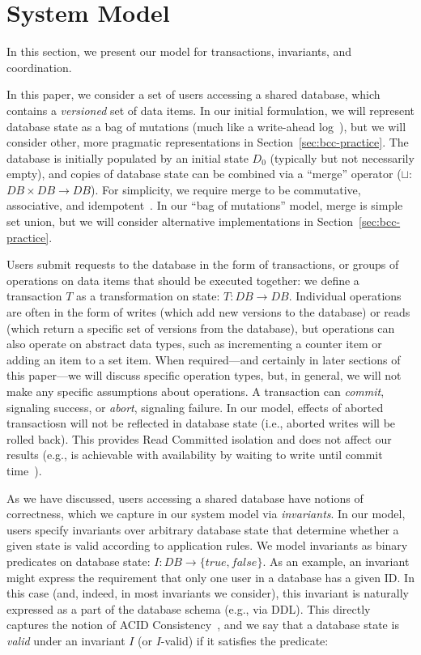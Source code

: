 
\section{System Model}
\label{sec:model}

In this section, we present our model for transactions, invariants,
and coordination.

 In this paper, we consider a set of users
accessing a shared database, which contains a \textit{versioned} set
of data items. In our initial formulation, we will represent database
state as a bag of mutations (much like a write-ahead
log~\cite{gray-book}), but we will consider other, more pragmatic
representations in Section~\ref{sec:bcc-practice}. The database is
initially populated by an initial state $D_0$ (typically but not
necessarily empty), and copies of database state can be combined via a
``merge'' operator ($\sqcup$: $DB \times DB \rightarrow DB$).  For
simplicity, we require merge to be commutative, associative, and
idempotent~\cite{calm,crdt}. In our ``bag of mutations'' model, merge
is simple set union, but we will consider alternative implementations
in Section~\ref{sec:bcc-practice}.

 Users submit requests to the database in the
form of transactions, or groups of operations on data items that
should be executed together: we define a transaction $T$ as a
transformation on state: $T: DB \rightarrow DB$. Individual operations
are often in the form of writes (which add new versions to the
database) or reads (which return a specific set of versions from the
database), but operations can also operate on abstract data types,
such as incrementing a counter item or adding an item to a set
item. When required---and certainly in later sections of this
paper---we will discuss specific operation types, but, in general, we
will not make any specific assumptions about operations. A transaction
can \textit{commit}, signaling success, or \textit{abort}, signaling
failure. In our model, effects of aborted transactiosn will not be
reflected in database state (i.e., aborted writes will be rolled
back). This provides Read Committed isolation and does not affect our
results (e.g., is achievable with availability by waiting to write
until commit time~\cite{hat-vldb,spanner}).

 As we have discussed, users accessing a shared
database have notions of correctness, which we capture in our system
model via \textit{invariants}. In our model, users specify invariants
over arbitrary database state that determine whether a given state is
valid according to application rules. We model invariants as binary
predicates on database state: $I: DB \rightarrow \{true, false\}$.  As
an example, an invariant might express the requirement that only one
user in a database has a given ID. In this case (and, indeed, in most
invariants we consider), this invariant is naturally expressed as a
part of the database schema (e.g., via DDL). This directly captures
the notion of ACID Consistency~\cite{bernstein-book,gray-virtues}, and
we say that a database state is \textit{valid} under an invariant $I$
(or $I$-valid) if it satisfies the predicate:

